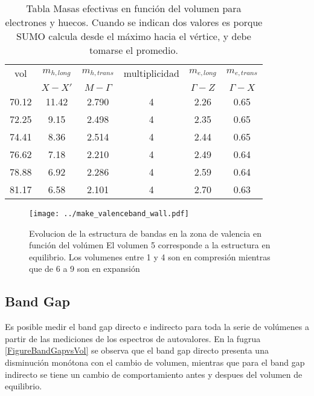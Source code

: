 \begin{table}
  \caption{
    \protect\label{TableEffMassVol} Tabla Masas efectivas en función del volumen para electrones 
    y huecos. Cuando se indican dos valores es porque SUMO calcula desde el máximo hacia 
    el vértice, y debe tomarse el promedio.
  }

    \small
    \centering
  \begin{tabular*}{0.8\textwidth}{c|c|c|c|c|c}
    \hline
vol&$m_{h, long}$ &$m_{h, trans}$ &multiplicidad& $m_{e,long}$ &$m_{e,trans}$ \\
       &$X - X'$&  $M - \Gamma$ &    &$\Gamma - Z$ &$\Gamma -  X$\\
     \hline
70.12  & 11.42       & 2.790  &  4  &   2.26   & 0.65 \\
72.25  & 9.15        & 2.498  &  4  &   2.35   & 0.65 \\ 
74.41  & 8.36        & 2.514  &  4  &   2.44   & 0.65 \\ 
76.62  & 7.18        & 2.210  &  4  &   2.49   & 0.64 \\
78.88  & 6.92        & 2.286  &  4  &   2.59   & 0.64 \\
81.17  & 6.58        & 2.101  &  4  &   2.70   & 0.63 \\
\hline
  \end{tabular*}
\end{table}

\begin{figure}

  \texttt{[image: ../make\_valenceband\_wall.pdf]}
  \caption{\label{FigureStructureBandWall} Evolucion de la estructura de bandas
  en la zona de valencia en función del volúmen El volumen 5 corresponde a 
  la estructura en equilibrio. Los volumenes entre 1 y 4 son en compresión 
  mientras que de 6 a 9 son en expansión}
\end{figure}

\subsection{Band Gap}
Es posible medir el band gap directo e indirecto para toda la serie de volúmenes a 
partir de las mediciones de los espectros de autovalores. En la fugrua 
\ref{FigureBandGapvsVol} se observa
que el band gap directo presenta una disminución monótona con el cambio
de volumen, mientras que para el band gap indirecto se tiene un cambio de comportamiento
antes y despues del volumen de equilibrio.

